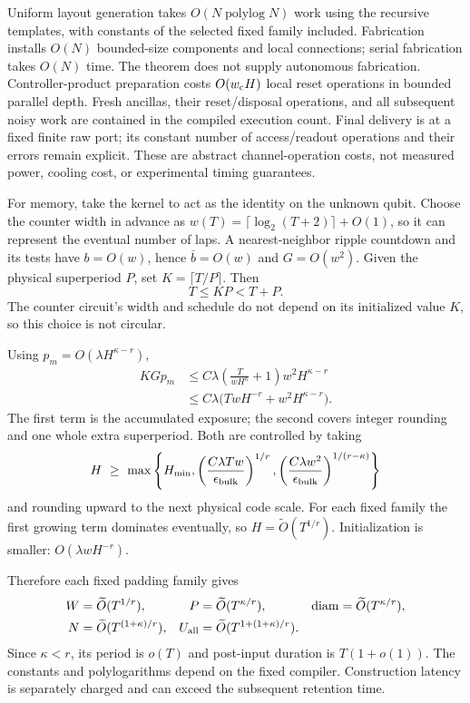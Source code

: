 \documentclass[11pt]{article}
\newcommand{\diam}{\operatorname{diam}}
\begin{document}
Uniform layout generation takes $O(N\operatorname{polylog}N)$ work
using the recursive templates, with constants of the selected fixed
family included. Fabrication installs $O(N)$ bounded-size components
and local connections; serial fabrication takes $O(N)$ time. The
theorem does not supply autonomous fabrication. Controller-product
preparation costs $O(w_{\rm c}H)$ local reset operations in bounded
parallel depth. Fresh ancillas, their reset/disposal operations, and all
subsequent noisy work are contained in the compiled execution count.
Final delivery is at a fixed finite raw port; its constant number of
access/readout operations and their errors remain explicit. These are
abstract channel-operation costs, not measured power, cooling cost, or
experimental timing guarantees.

For memory, take the kernel to act as the identity on the unknown qubit.
Choose the counter width in advance as
$w(T)=\lceil\log_2(T+2)\rceil+O(1)$, so it can represent the eventual
number of laps. A nearest-neighbor ripple countdown and its tests have
$b=O(w)$, hence $\bar b=O(w)$ and $G=O(w^2)$.
Given the physical superperiod $P$, set $K=\lceil T/P\rceil$. Then
\[
 T\leq KP<T+P.
\]
The counter circuit's width and schedule do not depend on its initialized
value $K$, so this choice is not circular.

Using $p_m=O(\lambda H^{\kappa-r})$,
\begin{align}
 KGp_m
 &\leq C\lambda\left(\frac{T}{wH^\kappa}+1\right)
                    w^2H^{\kappa-r}\\
 &\leq C\lambda\bigl(TwH^{-r}+w^2H^{\kappa-r}\bigr).
\end{align}
The first term is the accumulated exposure; the second covers integer
rounding and one whole extra superperiod. Both are controlled by taking
\[
 H\ \geq\
 \max\left\{H_{\min},
 \left(\frac{C\lambda Tw}{\epsilon_{\rm bulk}}\right)^{1/r},
 \left(\frac{C\lambda w^2}{\epsilon_{\rm bulk}}\right)^{1/(r-\kappa)}
 \right\}
\]
and rounding upward to the next physical code scale. For each fixed
family the first growing term dominates eventually, so
$H=\widetilde O(T^{1/r})$. Initialization is smaller:
$O(\lambda wH^{-r})$.

Therefore each fixed padding family gives
\begin{align}
 W&=\widetilde O(T^{1/r}),&
 P&=\widetilde O(T^{\kappa/r}),&
 \diam&=\widetilde O(T^{\kappa/r}),\\
 N&=\widetilde O(T^{(1+\kappa)/r}),&
 U_{\rm all}&=\widetilde O(T^{1+(1+\kappa)/r}).
\end{align}
Since $\kappa<r$, its period is $o(T)$ and post-input duration is
$T(1+o(1))$. The constants and polylogarithms depend on the fixed
compiler. Construction latency is separately charged and can exceed
the subsequent retention time.
\end{document}
